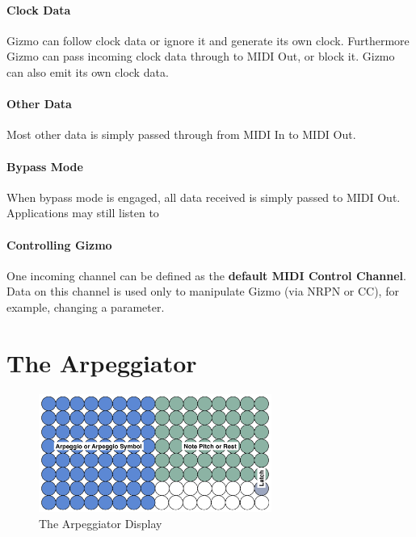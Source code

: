 \documentclass{article}
\begin{document}
\vspace{-0.5em}\paragraph{Clock Data} Gizmo can follow clock data or ignore it and generate its own clock.  Furthermore Gizmo can pass incoming clock data through to MIDI Out, or block it.  Gizmo can also emit its own clock data.

\vspace{-0.5em}\paragraph{Other Data} Most other data is simply passed through from MIDI In to MIDI Out.

\vspace{-0.5em}\paragraph{Bypass Mode} When bypass mode is engaged, all data received is simply passed to MIDI Out.  Applications may still listen to 

\vspace{-0.5em}\paragraph{Controlling Gizmo} One incoming channel can be defined as the {\bf default MIDI Control Channel}.  Data on this channel is used only to manipulate Gizmo (via NRPN or CC), for example, changing a parameter.


\clearpage
\section {The Arpeggiator}

\begin{figure}
\vspace{-1.5em}\includegraphics[width=3in]{arpeggio.pdf}
\vspace{-2em}\caption{\small The Arpeggiator Display}\vspace{-1em}
\label{arpeggiator}
\end{figure}
\end{document}
